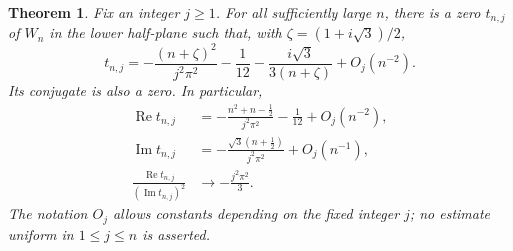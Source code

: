 \documentclass[11pt]{article}
\numberwithin{equation}{section}
\newtheorem{theorem}{Theorem}[section]
\theoremstyle{definition}
\newcommand{\Repart}{\operatorname{Re}}
\newcommand{\Impart}{\operatorname{Im}}
\begin{document}
\begin{theorem}\label{thm:asymptotic}
Fix an integer $j\geq1$.  For all sufficiently large $n$, there is a zero
$t_{n,j}$ of $W_n$ in the lower half-plane such that, with
$\zeta=(1+i\sqrt3)/2$,
\begin{equation}\label{eq:rootasymp}
 \boxed{\quad
 t_{n,j}=-\frac{(n+\zeta)^2}{j^2\pi^2}-\frac1{12}
         -\frac{i\sqrt3}{3(n+\zeta)}+O_j(n^{-2}).
 \quad}
\end{equation}
Its conjugate is also a zero.  In particular,
\begin{align}
 \Repart t_{n,j}&=-\frac{n^2+n-\frac12}{j^2\pi^2}
                      -\frac1{12}+O_j(n^{-2}),\label{eq:rootreal}\\
 \Impart t_{n,j}&=-\frac{\sqrt3(n+\frac12)}{j^2\pi^2}
                      +O_j(n^{-1}),\label{eq:rootimag}\\
 \frac{\Repart t_{n,j}}{(\Impart t_{n,j})^2}
                  &\longrightarrow-\frac{j^2\pi^2}{3}.\label{eq:parabolic}
\end{align}
The notation $O_j$ allows constants depending on the fixed integer $j$;
no estimate uniform in $1\leq j\leq n$ is asserted.
\end{theorem}
\end{document}
